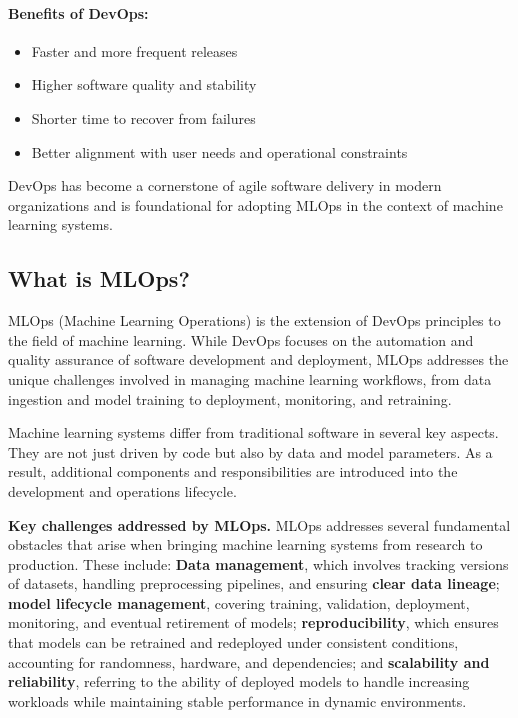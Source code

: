 \paragraph{Benefits of DevOps:}
\begin{itemize}
	\item Faster and more frequent releases
	\item Higher software quality and stability
	\item Shorter time to recover from failures
	\item Better alignment with user needs and operational constraints
\end{itemize}

DevOps has become a cornerstone of agile software delivery in modern organizations and is foundational for adopting MLOps in the context of machine learning systems.

%
\subsection{What is MLOps?}

MLOps (Machine Learning Operations) is the extension of DevOps principles to the field of machine learning. While DevOps focuses on the automation and quality assurance of software development and deployment, MLOps addresses the unique challenges involved in managing machine learning workflows, from data ingestion and model training to deployment, monitoring, and retraining.

Machine learning systems differ from traditional software in several key aspects. They are not just driven by code but also by data and model parameters. As a result, additional components and responsibilities are introduced into the development and operations lifecycle.

{\bf Key challenges addressed by MLOps.} MLOps addresses several fundamental obstacles that arise when bringing machine learning systems from research to production. These include:
{\bf Data management}, which involves tracking versions of datasets, handling preprocessing pipelines, and ensuring \textbf{clear data lineage};
{\bf model lifecycle management}, covering training, validation, deployment, monitoring, and eventual retirement of models; 
{\bf reproducibility}, which ensures that models can be retrained and redeployed under consistent conditions, accounting for randomness, hardware, and dependencies; and 
{\bf scalability and reliability}, referring to the ability of deployed models to handle increasing workloads while maintaining stable performance in dynamic environments.

